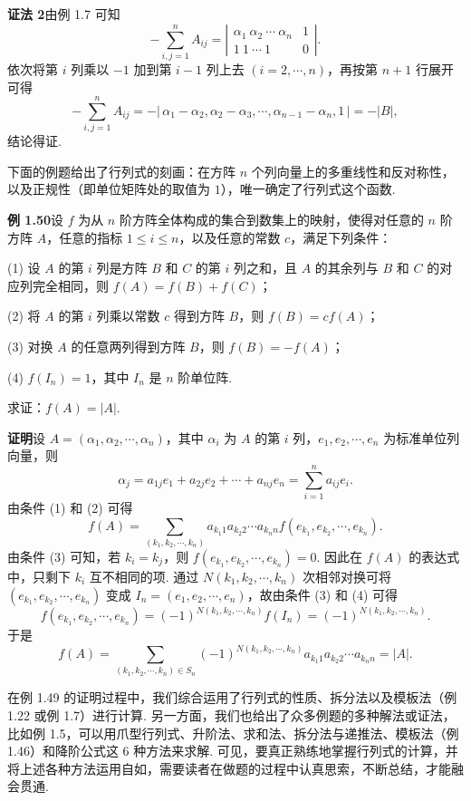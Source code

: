 \documentclass[UTF8, 12pt, fontset=fandol, oneside]{ctexart}
\begin{document}
\noindent\textbf{证法 2}\quad 由例 1.7 可知
\[
-\sum_{i,j=1}^n A_{ij}
=\left|\begin{array}{cc}
\alpha_1\ \alpha_2\ \cdots\ \alpha_n & 1\\
1\ 1\ \cdots\ 1 & 0
\end{array}\right|.
\]
依次将第 $i$ 列乘以 $-1$ 加到第 $i-1$ 列上去 $(i=2,\cdots,n)$，再按第 $n+1$ 行展开可得
\[
-\sum_{i,j=1}^n A_{ij}
=-|\,\alpha_1-\alpha_2,\alpha_2-\alpha_3,\cdots,\alpha_{n-1}-\alpha_n,1\,|
=-|B|,
\]
结论得证.

下面的例题给出了行列式的刻画：在方阵 $n$ 个列向量上的多重线性和反对称性，以及正规性（即单位矩阵处的取值为 $1$），唯一确定了行列式这个函数.

\noindent\textbf{例 1.50}\quad 设 $f$ 为从 $n$ 阶方阵全体构成的集合到数集上的映射，使得对任意的 $n$ 阶方阵 $A$，任意的指标 $1\le i\le n$，以及任意的常数 $c$，满足下列条件：

(1) 设 $A$ 的第 $i$ 列是方阵 $B$ 和 $C$ 的第 $i$ 列之和，且 $A$ 的其余列与 $B$ 和 $C$ 的对应列完全相同，则 $f(A)=f(B)+f(C)$；

(2) 将 $A$ 的第 $i$ 列乘以常数 $c$ 得到方阵 $B$，则 $f(B)=cf(A)$；

(3) 对换 $A$ 的任意两列得到方阵 $B$，则 $f(B)=-f(A)$；

(4) $f(I_n)=1$，其中 $I_n$ 是 $n$ 阶单位阵.

求证：$f(A)=|A|$.

\noindent\textbf{证明}\quad 设 $A=(\alpha_1,\alpha_2,\cdots,\alpha_n)$，其中 $\alpha_i$ 为 $A$ 的第 $i$ 列，$e_1,e_2,\cdots,e_n$ 为标准单位列向量，则
\[
\alpha_j=a_{1j}e_1+a_{2j}e_2+\cdots+a_{nj}e_n=\sum_{i=1}^n a_{ij}e_i.
\]
由条件 (1) 和 (2) 可得
\[
f(A)=\sum_{(k_1,k_2,\cdots,k_n)}
a_{k_1 1}a_{k_2 2}\cdots a_{k_n n}f(e_{k_1},e_{k_2},\cdots,e_{k_n}).
\]
由条件 (3) 可知，若 $k_i=k_j$，则 $f(e_{k_1},e_{k_2},\cdots,e_{k_n})=0$. 因此在 $f(A)$ 的表达式中，只剩下 $k_i$ 互不相同的项. 通过 $N(k_1,k_2,\cdots,k_n)$ 次相邻对换可将 $(e_{k_1},e_{k_2},\cdots,e_{k_n})$ 变成 $I_n=(e_1,e_2,\cdots,e_n)$，故由条件 (3) 和 (4) 可得
\[
f(e_{k_1},e_{k_2},\cdots,e_{k_n})=(-1)^{N(k_1,k_2,\cdots,k_n)}f(I_n)
=(-1)^{N(k_1,k_2,\cdots,k_n)}.
\]
于是
\[
f(A)=\sum_{(k_1,k_2,\cdots,k_n)\in S_n}
(-1)^{N(k_1,k_2,\cdots,k_n)}a_{k_1 1}a_{k_2 2}\cdots a_{k_n n}=|A|.
\]

在例 1.49 的证明过程中，我们综合运用了行列式的性质、拆分法以及模板法（例 1.22 或例 1.7）进行计算. 另一方面，我们也给出了众多例题的多种解法或证法，比如例 1.5，可以用爪型行列式、升阶法、求和法、拆分法与递推法、模板法（例 1.46）和降阶公式这 6 种方法来求解. 可见，要真正熟练地掌握行列式的计算，并将上述各种方法运用自如，需要读者在做题的过程中认真思索，不断总结，才能融会贯通.
\end{document}
